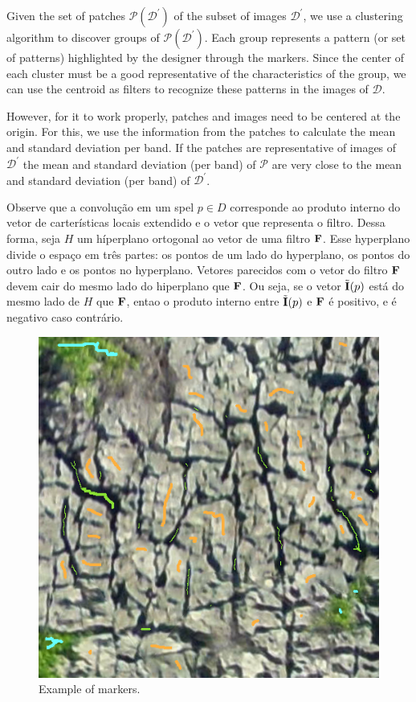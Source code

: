 \documentclass[10pt,twocolumn,letterpaper]{article}
\newcommand{\D}{\mathcal{D}}
\newcommand{\m}[1]{{\mathrm{\bf #1}}}
\newcommand{\E}{\tilde{\m{I}}}
\newcommand{\mF}{\m{F}}
\newcommand{\Pa}{\mathcal{P}}
\newcommand{\pDD}{\D^\prime}
\begin{document}
Given the set of patches $\Pa(\pDD)$ of the subset of images $\pDD$, we use a clustering algorithm to discover groups of $\Pa(\pDD)$. Each group represents a pattern (or set of patterns) highlighted by the designer through the markers. Since the center of each cluster must be a good representative of the characteristics of the group, we can use the centroid as filters to recognize these patterns in the images of $\D$.

However, for it to work properly, patches and images need to be centered at the origin. For this, we use the information from the patches to calculate the mean and standard deviation per band. If the patches are representative of images of $\pDD$ the mean and standard deviation (per band) of $\Pa$ are very close to the mean and standard deviation (per band) of $\pDD$.

Observe que a convolução em um spel $p \in D$ corresponde ao produto interno do vetor de carterísticas locais extendido e o vetor que representa o filtro. Dessa forma, seja $H$ um híperplano ortogonal ao vetor de uma filtro $\mF$. Esse hyperplano divide o espaço em três partes: os pontos de um lado do hyperplano, os pontos do outro lado e os pontos no hyperplano. Vetores parecidos com o vetor do filtro $\mF$ devem cair do mesmo lado do hiperplano que $\mF$. Ou seja, se o vetor $\E(p)$ está do mesmo lado de $H$ que $\mF$, entao o produto interno entre $\E(p)$ e $\mF$ é positivo, e é negativo caso contrário.

\begin{figure}[t]
  \begin{center}
     \includegraphics[width=0.8\linewidth]{figures/tile0705-markers.png}
  \end{center}
     \caption{Example of markers.}
  \label{fig:ex-markers}
\end{figure}
\end{document}
